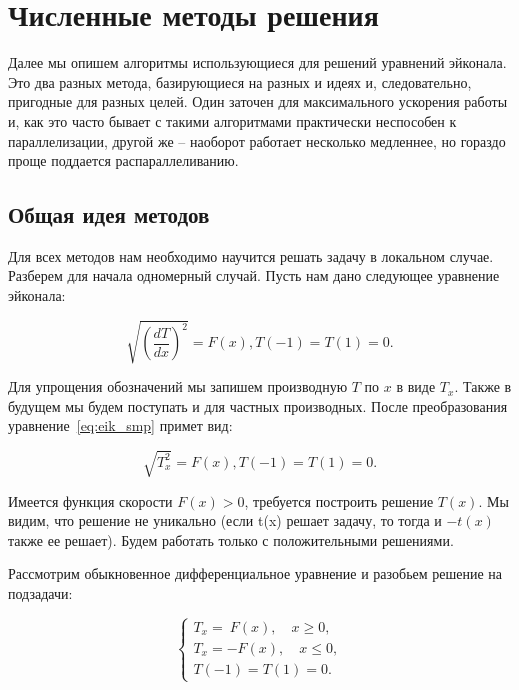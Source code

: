 \section{Численные методы решения}
\label{sec:algrhtms}

Далее мы опишем алгоритмы использующиеся для решений уравнений
эйконала. Это два разных метода, базирующиеся на разных и идеях и,
следовательно, пригодные для разных целей. Один заточен для
максимального ускорения работы и, как это часто бывает с такими
алгоритмами практически неспособен к параллелизации, другой же --
наоборот работает несколько медленнее, но гораздо проще поддается
распараллеливанию.

\subsection{Общая идея методов}
\label{sec:general-idea}

Для всех методов нам необходимо научится решать задачу в локальном
случае. Разберем для начала одномерный случай. Пусть нам дано
следующее уравнение эйконала:

\begin{equation}
  \label{eq:eik_smp}
  \sqrt{(\frac{dT}{dx})^2}=F(x), T(-1) = T(1) = 0.
\end{equation}

Для упрощения обозначений мы запишем производную $T$ по $x$ в виде
$T_x$. Также в будущем мы будем поступать и для частных
производных. После преобразования уравнение~\eqref{eq:eik_smp} примет вид:

\begin{equation*}
  \sqrt{T_x^2}=F(x), T(-1) = T(1) = 0.
\end{equation*}


Имеется функция скорости $F(x) > 0$, требуется построить
решение $T(x)$. Мы видим, что решение не уникально (если t(x) решает
задачу, то тогда и $-t(x)$ также ее решает). Будем работать только с
положительными решениями.

Рассмотрим обыкновенное дифференциальное уравнение и разобьем решение
на подзадачи:

\begin{equation*}
  \left\{
      \begin{array}{ll}
        T_x = ~F(x), \quad x \ge 0,\\
        T_x = -F(x), \quad x \le 0,\\[0.3cm]
        T(-1)= T(1) = 0.
      \end{array}
    \right.
\end{equation*}

